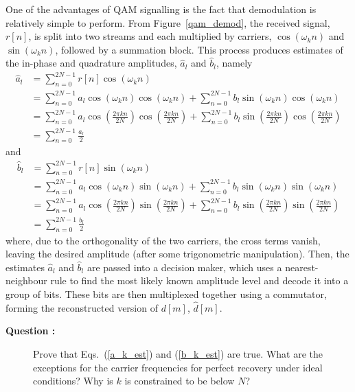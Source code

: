 \documentclass[12pt]{article}
\newcounter{questioncnt}
\begin{document}
One of the advantages of QAM signalling is the fact that
demodulation is relatively simple to perform. From
Figure~\ref{qam_demod}, the received signal, $r[n]$, is split into
two streams and each multiplied by carriers, $\cos(\omega_kn)$ and
$\sin(\omega_kn)$, followed by a summation block. This process
produces estimates of the in-phase and quadrature amplitudes,
$\hat{a}_l$ and $\hat{b}_l$, namely
\begin{equation}\label{a_k_est}\begin{split}
\hat{a}_l&=\sum\limits_{n=0}^{2N-1}r[n]\cos(\omega_kn)\\
&=\sum\limits_{n=0}^{2N-1}a_l\cos(\omega_kn)\cos(\omega_kn)+\sum\limits_{n=0}^{2N-1}b_l\sin(\omega_kn)\cos(\omega_kn)\\
&=\sum\limits_{n=0}^{2N-1}a_l\cos\left(\frac{2\pi{k}{n}}{2N}\right)\cos\left(\frac{2\pi{k}{n}}{2N}\right)+\sum\limits_{n=0}^{2N-1}b_l\sin\left(\frac{2\pi{k}{n}}{2N}\right)\cos\left(\frac{2\pi{k}{n}}{2N}\right)\\
&=\sum\limits_{n=0}^{2N-1}\frac{a_l}{2}
\end{split}\end{equation} and
\begin{equation}\label{b_k_est}\begin{split}
\hat{b}_l&=\sum\limits_{n=0}^{2N-1}r[n]\sin(\omega_kn)\\
&=\sum\limits_{n=0}^{2N-1}a_l\cos(\omega_kn)\sin(\omega_kn)+\sum\limits_{n=0}^{2N-1}b_l\sin(\omega_kn)\sin(\omega_kn)\\
&=\sum\limits_{n=0}^{2N-1}a_l\cos\left(\frac{2\pi{k}{n}}{2N}\right)\sin\left(\frac{2\pi{k}{n}}{2N}\right)+\sum\limits_{n=0}^{2N-1}b_l\sin\left(\frac{2\pi{k}{n}}{2N}\right)\sin\left(\frac{2\pi{k}{n}}{2N}\right)\\
&=\sum\limits_{n=0}^{2N-1}\frac{b_l}{2}
\end{split}\end{equation}
where, due to the orthogonality of the two carriers, the cross
terms vanish, leaving the desired amplitude (after some
trigonometric manipulation). Then, the estimates $\hat{a}_l$ and
$\hat{b}_l$ are passed into a decision maker, which uses a
nearest-neighbour rule to find the most likely known amplitude
level and decode it into a group of bits. These bits are then
multiplexed together using a commutator, forming the reconstructed
version of $d[m]$, $\hat{d}[m]$.

\begin{description}
    \item[{\bf Question :}]
    Prove that Eqs.~(\ref{a_k_est}) and (\ref{b_k_est}) are true. What are the exceptions
    for the carrier frequencies for perfect recovery under ideal conditions? Why is $k$ is constrained to be
    below $N$?
\end{description}
\end{document}
